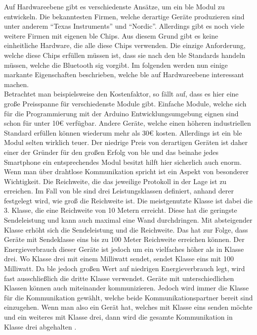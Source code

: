Auf Hardwareebene gibt es verschiedenste Ansätze, um ein \ac{ble} Modul zu entwickeln. Die bekanntesten Firmen, welche derartige Geräte produzieren sind unter anderem "`Texas Instruments"' und "`Nordic"'. Allerdings gibt es noch viele weitere Firmen mit eigenen \ac{ble} Chips. Aus diesem Grund gibt es keine einheitliche Hardware, die alle diese Chips verwenden. Die einzige Anforderung, welche diese Chips erfüllen müssen ist, dass sie nach den \ac{ble} Standards handeln müssen, welche die Bluetooth \ac{sig} vorgibt. Im folgenden werden nun einige markante Eigenschaften beschrieben, welche \ac{ble} auf Hardwareebene interessant machen.\\

\noindent Betrachtet man beispielsweise den Kostenfaktor, so fällt auf, dass es hier eine große Preisspanne für verschiedenste Module gibt. Einfache Module, welche sich für die Programmierung mit der Arduino Entwicklungsumgebung eignen sind schon für unter 10€ verfügbar. Andere Geräte, welche einen höheren industriellen Standard erfüllen können wiederum mehr als 30€ kosten. Allerdings ist ein \ac{ble} Modul selten wirklich teuer. Der niedrige Preis von derartigen Geräten ist daher einer der Gründer für den großen Erfolg von \ac{ble} und das beinahe jedes Smartphone ein entsprechendes Modul besitzt hilft hier sicherlich auch enorm.\\

\noindent Wenn man über drahtlose Kommunikation spricht ist ein Aspekt von besonderer Wichtigkeit. Die Reichweite, die das jeweilige Protokoll in der Lage ist zu erreichen. Im Fall von \ac{ble} sind drei Leistungsklassen definiert, anhand derer festgelegt wird, wie groß die Reichweite ist. Die meistgenutzte Klasse ist dabei die 3. Klasse, die eine Reichweite von 10 Metern erreicht. Diese hat die geringste Sendeleistung und kann auch maximal eine Wand durchdringen. Mit absteigender Klasse erhöht sich die Sendeleistung und die Reichweite. Das hat zur Folge, dass Geräte mit Sendeklasse eins bis zu 100 Meter Reichweite erreichen können. Der Energieverbrauch dieser Geräte ist jedoch um ein vielfaches höher als in Klasse drei. Wo Klasse drei mit einem Milliwatt sendet, sendet Klasse eins mit 100 Milliwatt. Da \ac{ble} jedoch großen Wert auf niedrigen Energieverbrauch legt, wird fast ausschließlich die dritte Klasse verwendet. Geräte mit unterschiedlichen Klassen können auch miteinander kommunizieren. Jedoch wird immer die Klasse für die Kommunikation gewählt, welche beide Kommunikationspartner bereit sind einzugehen. Wenn man also ein Gerät hat, welches mit Klasse eins senden möchte und ein weiteres mit Klasse drei, dann wird die gesamte Kommunikation in Klasse drei abgehalten \cite[Seite 411]{Sauter18:GMK}.\\ 

